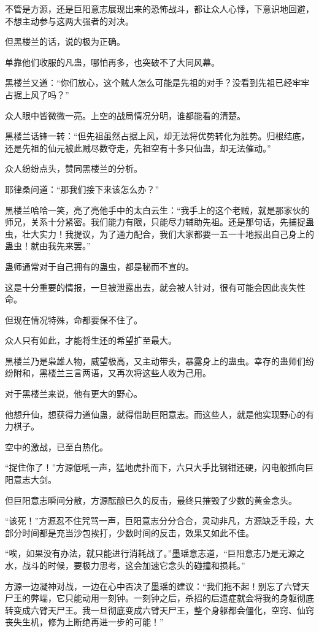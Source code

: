 \begin{this_body}
不管是方源，还是巨阳意志展现出来的恐怖战斗，都让众人心悸，下意识地回避，不想主动参与这两大强者的对决。

但黑楼兰的话，说的极为正确。

单靠他们收服的凡蛊，哪怕再多，也突破不了大同风幕。

黑楼兰又道：“你们放心，这个贼人怎么可能是先祖的对手？没看到先祖已经牢牢占据上风了吗？”

众人眼中皆微微一亮。上空的战局情况分明，谁都能看的清楚。

黑楼兰话锋一转：“但先祖虽然占据上风，却无法将优势转化为胜势。归根结底，还是先祖的仙元被此贼尽数夺走，先祖空有十多只仙蛊，却无法催动。”

众人纷纷点头，赞同黑楼兰的分析。

耶律桑问道：“那我们接下来该怎么办？”

黑楼兰哈哈一笑，亮了亮他手中的太白云生：“我手上的这个老贼，就是那家伙的师兄，关系十分紧密。我们能力有限，只能尽力辅助先祖。还是那句话，先捕捉蛊虫，壮大实力！我提议，为了通力配合，我们大家都要一五一十地报出自己身上的蛊虫！就由我先来罢。”

蛊师通常对于自己拥有的蛊虫，都是秘而不宣的。

这是十分重要的情报，一旦被泄露出去，就会被人针对，很有可能会因此丧失性命。

但现在情况特殊，命都要保不住了。

众人只有如此，才能将生还的希望扩至最大。

黑楼兰乃是枭雄人物，威望极高，又主动带头，暴露身上的蛊虫。幸存的蛊师们纷纷附和，黑楼兰三言两语，又再次将这些人收为己用。

对于黑楼兰来说，他有更大的野心。

他想升仙，想获得力道仙蛊，就得借助巨阳意志。而这些人，就是他实现野心的有力棋子。

空中的激战，已至白热化。

“捉住你了！”方源低吼一声，猛地虎扑而下，六只大手比钢钳还硬，闪电般抓向巨阳意志大剑。

但巨阳意志瞬间分散，方源酝酿已久的反击，最终只摧毁了少数的黄金念头。

“该死！”方源忍不住咒骂一声，巨阳意志分分合合，灵动非凡，方源缺乏手段，大部分时间都是充当沙包挨打，少数时间的反击，效果又如此不佳。

“唉，如果没有办法，就只能进行消耗战了。”墨瑶意志道，“巨阳意志乃是无源之水，战斗的时候，要极力思考，这会加速它念头的碰撞和损耗。”

方源一边凝神对战，一边在心中否决了墨瑶的建议：“我们拖不起！别忘了六臂天尸王的弊端，它只能动用一刻钟。一刻钟之后，杀招的后遗症就会将我的身躯彻底转变成六臂天尸王。我一旦彻底变成六臂天尸王，整个身躯都会僵化，空窍、仙窍丧失生机，修为上断绝再进一步的可能！”


\end{this_body}

